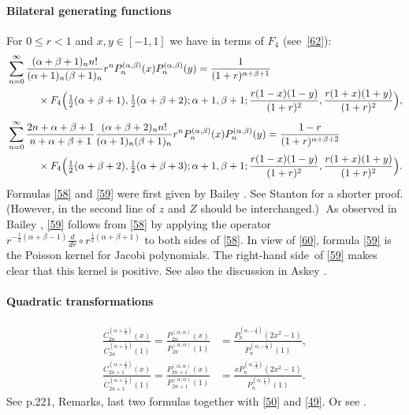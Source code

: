 \documentclass[twoside,11pt]{article}
\newcommand\sa{\smallskipamount}
\newcommand\sLP{\\[\sa]}
\newcommand\al\alpha
\newcommand\be\beta
\newcommand\half{\frac12}
\newcommand\thalf{\tfrac12}
\newcommand\iy\infty
\newcommand\RHS{right-hand side}
\begin{document}
\paragraph{Bilateral generating functions}
For $0\le r<1$ and $x,y\in[-1,1]$ we have in terms of $F_4$ (see~\eqref{62}):
\begin{align}
&\sum_{n=0}^\iy\frac{(\al+\be+1)_n n!}{(\al+1)_n(\be+1)_n} r^n 
P_n^{(\al,\be)}(x) P_n^{(\al,\be)}(y)
=\frac1{(1+r)^{\al+\be+1}}
\nonumber\\
&\qquad\quad\times F_4\Big(\thalf(\al+\be+1),\thalf(\al+\be+2);\al+1,\be+1;
\frac{r(1-x)(1-y)}{(1+r)^2},\frac{r(1+x)(1+y)}{(1+r)^2}\Big),
\label{58}\sLP
&\sum_{n=0}^\iy\frac{2n+\al+\be+1}{n+\al+\be+1}
\frac{(\al+\be+2)_n n!}{(\al+1)_n(\be+1)_n} r^n 
P_n^{(\al,\be)}(x) P_n^{(\al,\be)}(y)
=\frac{1-r}{(1+r)^{\al+\be+2}}\nonumber\\
&\qquad\quad\times F_4\Big(\thalf(\al+\be+2),\thalf(\al+\be+3);\al+1,\be+1;
\frac{r(1-x)(1-y)}{(1+r)^2},\frac{r(1+x)(1+y)}{(1+r)^2}\Big).
\label{59}
\end{align}
Formulas \eqref{58} and \eqref{59} were first
given by Bailey .
See Stanton  for a shorter proof.
(However, in the second line of
 $z$ and $Z$ should be interchanged.)$\;$
As observed in Bailey , \eqref{59} follows
from \eqref{58}
by applying the operator $r^{-\half(\al+\be-1)} \frac d{dr}\circ r^{\half(\al+\be+1)}$
to both sides of \eqref{58}.
In view of \eqref{60}, formula \eqref{59} is the Poisson kernel for Jacobi
polynomials. The \RHS\ of \eqref{59} makes clear that this kernel is positive.
See also the discussion in Askey .
%
\paragraph{Quadratic transformations}
\begin{align}
\frac{C_{2n}^{(\al+\half)}(x)}{C_{2n}^{(\al+\half)}(1)}
=\frac{P_{2n}^{(\al,\al)}(x)}{P_{2n}^{(\al,\al)}(1)}
&=\frac{P_n^{(\al,-\half)}(2x^2-1)}{P_n^{(\al,-\half)}(1)} ,
\label{51}\\
\frac{C_{2n+1}^{(\al+\half)}(x)}{C_{2n+1}^{(\al+\half)}(1)}
=\frac{P_{2n+1}^{(\al,\al)}(x)}{P_{2n+1}^{(\al,\al)}(1)}
&=\frac{x P_n^{(\al,\half)}(2x^2-1)}{P_n^{(\al,\half)}(1)} .
\label{52}
\end{align}
See p.221, Remarks, last two formulas together with \eqref{50} and \eqref{49}.
Or see .
%
\end{document}
